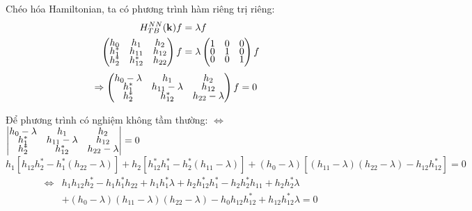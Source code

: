 \documentclass{report}
\begin{document}
\clearpage
Chéo hóa Hamiltonian, ta có phương trình hàm riêng trị riêng:
\begin{align*}
	H_{TB}^{NN}(\mathbf{k}) f & = \lambda f \\
	\begin{pmatrix}
		\renewcommand{\arraystretch}{0.72}
		h_0   & h_1      & h_2    \\
		h_1^* & h_{11}   & h_{12} \\
		h_2^* & h_{12}^* & h_{22}
	\end{pmatrix}f
	                          & = \lambda
	\begin{pmatrix}
		\renewcommand{\arraystretch}{0.72}
		1 & 0 & 0 \\
		0 & 1 & 0 \\
		0 & 0 & 1 \\
	\end{pmatrix}f
\end{align*}
\begin{align*}
	\Rightarrow
	\begin{pmatrix}
		\renewcommand{\arraystretch}{0.72}
		h_0 - \lambda & h_1              & h_2              \\
		h_1^*         & h_{11} - \lambda & h_{12}           \\
		h_2^*         & h_{12}^*         & h_{22} - \lambda
	\end{pmatrix}f
	 & = 0
\end{align*}

Để phương trình có nghiệm không tầm thường: $\Leftrightarrow$
$
	\begin{vmatrix}
		\renewcommand{\arraystretch}{0.5}
		h_0 - \lambda & h_1              & h_2              \\
		h_1^*         & h_{11} - \lambda & h_{12}           \\
		h_2^*         & h_{12}^*         & h_{22} - \lambda
	\end{vmatrix} = 0
$
\begin{equation*}
	h_{1}^{}\left[h_{12}^{}h_2^* - h_1^*(h_{22}^{} - \lambda)\right] + h_2^{}\left[h_{12}^* h_1^* - h_2^*(h_{11}^{} - \lambda) \right] + (h_0^{} - \lambda)\left[(h_{11}^{} - \lambda)(h_{22}^{} - \lambda) - h_{12}^{}h_{12}^*\right] = 0
\end{equation*}
\begin{align*}
	\Leftrightarrow & h_{1}^{} h_{12}^{} h_2^{*} - h_{1}^{} h_{1}^{*} h_{22}^{} + h_{1}^{} h_{1}^{*} \lambda + h_{2}^{} h_{12}^{*} h_1^{*} - h_{2}^{} h_{2}^{*} h_{11} + h_{2}^{} h_{2}^{*} \lambda \\
	                & + (h_{0}^{} - \lambda) (h_{11}^{} - \lambda) (h_{22}^{} - \lambda) - h_{0}^{} h_{12}^{} h_{12}^{*} + h_{12}^{} h_{12}^{*} \lambda = 0
\end{align*}
\end{document}
